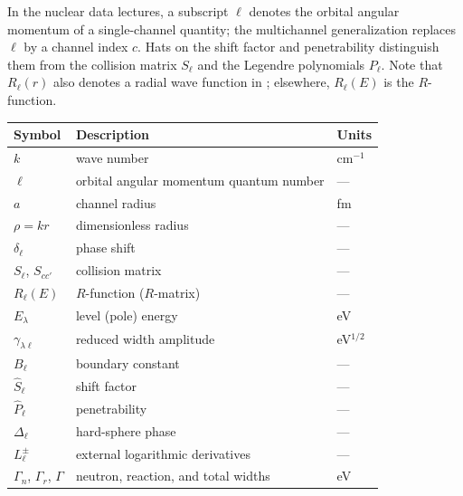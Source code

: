 In the nuclear data lectures, a subscript $\ell$ denotes the orbital angular momentum of a single-channel quantity; the multichannel generalization replaces $\ell$ by a channel index $c$.  Hats on the shift factor and penetrability distinguish them from the collision matrix $S_\ell$ and the Legendre polynomials $P_\ell$.  Note that $R_\ell(r)$ also denotes a radial wave function in ; elsewhere, $R_\ell(E)$ is the $R$-function.

\begin{center}
 {\small
 \begin{tabular*}{0.95\textwidth}{@{\extracolsep{\fill}} lll }
  \toprule
   Symbol                                        & Description                   & Units  \\
  \midrule
   $k$                                           & wave number                   & cm$^{-1}$ \\
   $\ell$                                        & orbital angular momentum quantum number & --- \\
   $a$                                           & channel radius                & fm \\
   $\rho = kr$                                   & dimensionless radius          & --- \\
   $\delta_\ell$                                 & phase shift                   & --- \\
   $S_\ell$, $S_{cc'}$                           & collision matrix              & --- \\
   $R_\ell(E)$                                   & $R$-function ($R$-matrix)     & --- \\
   $E_\lambda$                                   & level (pole) energy           & eV \\
   $\gamma_{\lambda\ell}$                        & reduced width amplitude       & eV$^{1/2}$ \\
   $B_\ell$                                      & boundary constant             & --- \\
   $\widehat{S}_\ell$                            & shift factor                  & --- \\
   $\widehat{P}_\ell$                            & penetrability                 & --- \\
   $\Delta_\ell$                                 & hard-sphere phase             & --- \\
   $L_\ell^{\pm}$                                & external logarithmic derivatives & --- \\
   $\Gamma_n$, $\Gamma_r$, $\Gamma$              & neutron, reaction, and total widths & eV \\
  \bottomrule
 \end{tabular*}
 }
\end{center}

